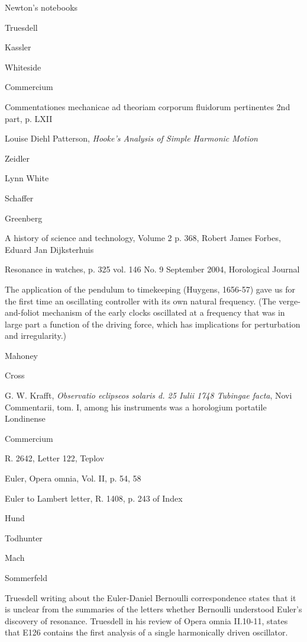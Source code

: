 \documentclass{article}
\begin{document}
Newton's notebooks \cite[p.~310]{newton}

Truesdell \cite[pp.~22, 170--178]{rational}

Kassler \cite[pp.~53, 57]{kassler}

Whiteside \cite[p.~335]{newtonVI}

Commercium \cite[pp.~54, 58, 304, 305, 695]{commerciumII}

Commentationes mechanicae ad theoriam corporum fluidorum pertinentes 2nd part, p. LXII

Louise Diehl Patterson, {\em Hooke's Analysis of Simple Harmonic Motion}

Zeidler \cite[\S 5.9]{zeidler}

Lynn White \cite[pp.~126--127]{white}

Schaffer \cite[p.~157]{schaffer}

Greenberg \cite[p.~548]{greenberg}

A history of science and technology, Volume 2 p. 368, Robert James Forbes, Eduard Jan Dijksterhuis

Resonance in watches, p. 325 vol. 146 No. 9 September 2004, Horological Journal

The application of the pendulum to timekeeping (Huygens, 1656-57) gave us for the first time an oscillating controller with its own natural frequency. (The verge-and-foliot mechanism of the early clocks oscillated at a frequency that was in large part a function of the driving force, which has implications for perturbation and irregularity.)

Mahoney \cite[p.~303]{mahoney}

Cross \cite[p.~227]{cross}

G. W. Krafft, {\em Observatio eclipseos solaris d. 25 Iulii 1748 Tubingae facta}, Novi Commentarii, tom. I, among his instruments was a horologium portatile Londinense

Commercium \cite[p.~77]{commerciumVI}

R. 2642, Letter 122, Teplov

Euler, Opera omnia, Vol. II, p. 54, 58

Euler to Lambert letter, R. 1408, p. 243 of Index

Hund \cite[p.~170]{hund}

Todhunter \cite[p.~39]{todhunter}

Mach \cite[p.~272]{mach}

Sommerfeld \cite{sommerfeld}

Truesdell \cite[p.~309]{truesdell1984} writing about the Euler-Daniel Bernoulli correspondence states that it is unclear from the summaries of the letters whether Bernoulli
understood Euler's discovery of resonance. Truesdell \cite[p.~323]{truesdell1984}  in his review of Opera omnia II.10-11, states that E126 contains the first analysis of a single
harmonically driven oscillator.
\end{document}
